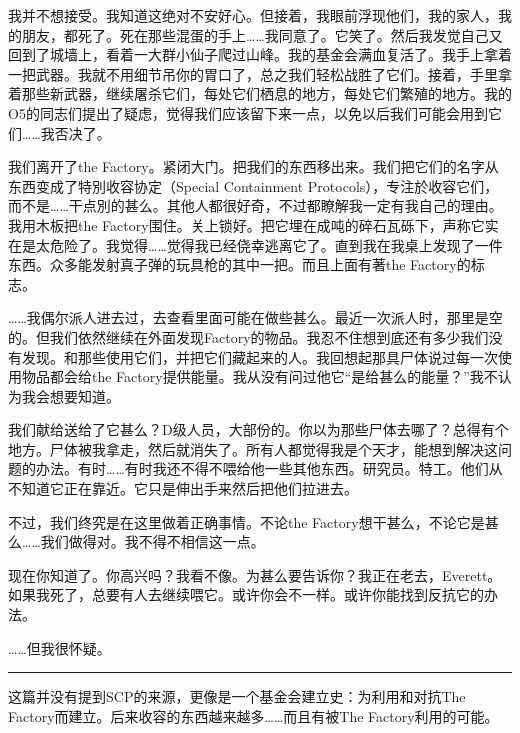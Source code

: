 \documentclass[openany,a4paper]{book} %
\begin{document}
我并不想接受。我知道这绝对不安好心。但接着，我眼前浮现他们，我的家人，我的朋友，都死了。死在那些混蛋的手上……我同意了。它笑了。然后我发觉自己又回到了城墙上，看着一大群小仙子爬过山峰。我的基金会满血复活了。我手上拿着一把武器。我就不用细节吊你的胃口了，总之我们轻松战胜了它们。接着，手里拿着那些新武器，继续屠杀它们，每处它们栖息的地方，每处它们繁殖的地方。我的O5的同志们提出了疑虑，觉得我们应该留下来一点，以免以后我们可能会用到它们……我否决了。\vspace{12pt}

我们离开了the Factory。紧闭大门。把我们的东西移出来。我们把它们的名字从东西变成了特別收容协定（Special Containment Protocols），专注於收容它们，而不是……干点別的甚么。其他人都很好奇，不过都瞭解我一定有我自己的理由。我用木板把the Factory围住。关上锁好。把它埋在成吨的碎石瓦砾下，声称它实在是太危险了。我觉得……觉得我已经侥幸逃离它了。直到我在我桌上发现了一件东西。众多能发射真子弹的玩具枪的其中一把。而且上面有著the Factory的标志。\vspace{12pt}

……我偶尔派人进去过，去查看里面可能在做些甚么。最近一次派人时，那里是空的。但我们依然继续在外面发现Factory的物品。我忍不住想到底还有多少我们没有发现。和那些使用它们，并把它们藏起来的人。我回想起那具尸体说过每一次使用物品都会给the Factory提供能量。我从没有问过他它“是给甚么的能量？”我不认为我会想要知道。\vspace{12pt}

我们献给送给了它甚么？D级人员，大部份的。你以为那些尸体去哪了？总得有个地方。尸体被我拿走，然后就消失了。所有人都觉得我是个天才，能想到解决这问题的办法。有时……有时我还不得不喂给他一些其他东西。研究员。特工。他们从不知道它正在靠近。它只是伸出手来然后把他们拉进去。\vspace{12pt}

不过，我们终究是在这里做着正确事情。不论the Factory想干甚么，不论它是甚么……我们做得对。我不得不相信这一点。\vspace{12pt}

现在你知道了。你高兴吗？我看不像。为甚么要告诉你？我正在老去，Everett。如果我死了，总要有人去继续喂它。或许你会不一样。或许你能找到反抗它的办法。\vspace{12pt}

……但我很怀疑。\vspace{12pt}

\hrule\vspace{12pt}

这篇并没有提到SCP的来源，更像是一个基金会建立史：为利用和对抗The Factory而建立。后来收容的东西越来越多……而且有被The Factory利用的可能。\vspace{12pt}
\end{document}
